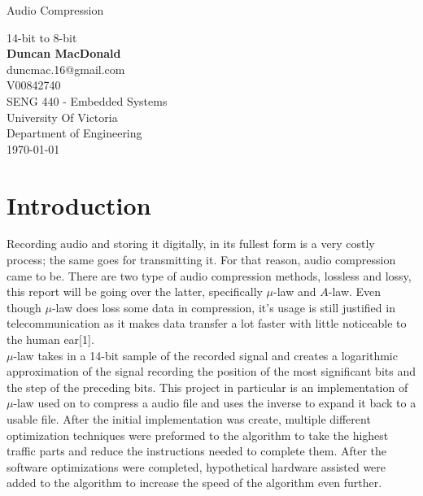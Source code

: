 \documentclass[12pt]{article}
\begin{document}
\begin{titlepage}

\begin{center}
\begin{huge}
Audio Compression\\
\end{huge}
14-bit to 8-bit\\
\vspace{1.5cm}
\textbf{Duncan MacDonald}\\
duncmac.16@gmail.com\\
V00842740\\
\vfill
SENG 440 - Embedded Systems\\
University Of Victoria\\
Department of Engineering\\
\vspace{1.5cm}
\today
\end{center}
\end{titlepage}
\newpage
\tableofcontents
\listoffigures
\newpage
\section{Introduction}
\indent 
Recording audio and storing it digitally, in its fullest form is a very costly process; the same goes for transmitting it. For that reason, audio compression came to be. There are two type of audio compression methods, lossless and lossy, this report will be going over the latter, specifically $\mu$-law and $A$-law. Even though $\mu$-law does loss some data in compression, it's usage is still justified in telecommunication as it makes data transfer a lot faster with little noticeable to the human ear[1].\\

$\mu$-law takes in a 14-bit sample of the recorded signal and creates a logarithmic approximation of the signal recording the position of the most significant bits and the step of the preceding bits. This project in particular is an implementation of $\mu$-law used on to compress a audio file and uses the inverse to expand it back to a usable file. After the initial implementation was create, multiple different optimization techniques were preformed to the algorithm to take the highest traffic parts and reduce the instructions needed to complete them. After the software optimizations were completed, hypothetical hardware assisted were added to the algorithm to increase the speed of the algorithm even further.\\
\end{document}
